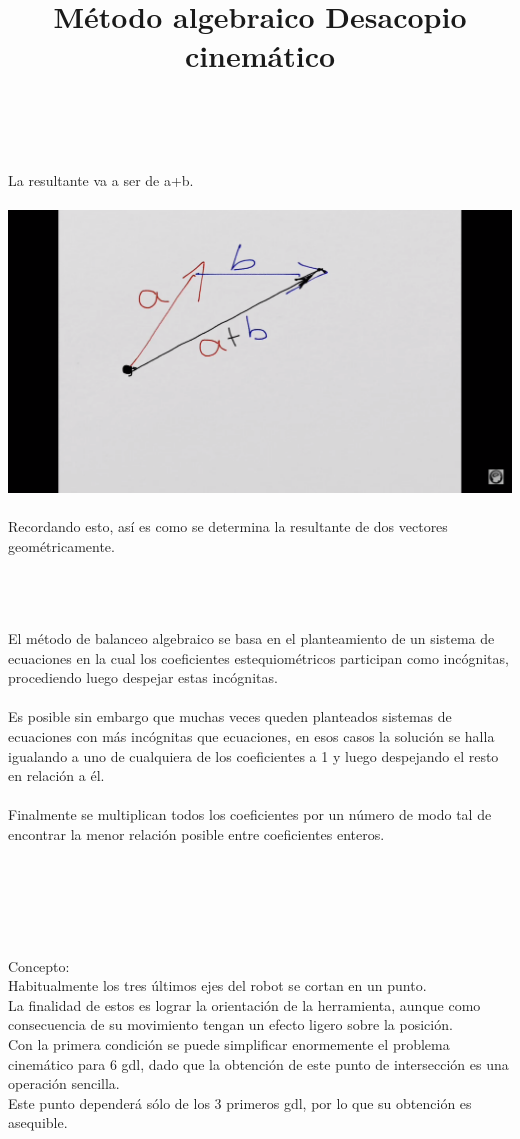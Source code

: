 \documentclass[12pt,a4paper]{article}
\begin{document}
\\\\
\newpage
La resultante va a ser de a+b.
\\\\
\includegraphics[scale=0.47]{imagen3.png} 
\\\\
Recordando esto, así es como se determina la resultante de dos vectores geométricamente.
\\\\
\title{Método algebraico}
\\\\
El método de balanceo algebraico se basa en el planteamiento de un sistema de ecuaciones en la cual los coeficientes estequiométricos participan como incógnitas, procediendo luego despejar estas incógnitas.
\\\\
Es posible sin embargo que muchas veces queden planteados sistemas de ecuaciones con más incógnitas que ecuaciones, en esos casos la solución se halla igualando a uno de cualquiera de los coeficientes a 1 y luego despejando el resto en relación a él. 
\\\\
Finalmente se multiplican todos los coeficientes por un número de modo tal de encontrar la menor relación posible entre coeficientes enteros.
\\\\\\\\
\title{
Desacopio cinemático
}
\\\\
Concepto:
\\
Habitualmente los tres últimos ejes del robot se cortan en un punto.
\\
La finalidad de estos es lograr la orientación de la herramienta, aunque como consecuencia de su movimiento tengan un efecto ligero sobre la posición.
\\
Con la primera condición se puede simplificar enormemente el problema cinemático para 6 gdl, dado que la obtención de este punto de intersección es una operación sencilla.
\\
Este punto dependerá sólo de los 3 primeros gdl, por lo que su obtención es asequible.
\end{document}
